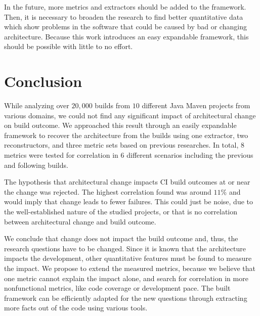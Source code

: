 \documentclass[sigplan, anonymous, review]{acmart}
\begin{document}
In the future, more metrics and extractors should be added to the framework. Then, it is necessary to broaden the research to find better quantitative data which show problems in the software that could be caused by bad or changing architecture. Because this work introduces an easy expandable framework, this should be possible with little to no effort.

\section{Conclusion}

While analyzing over $20,000$ builds from $10$ different Java Maven projects from various domains, we could not find any significant impact of architectural change on build outcome.
We approached this result through an easily expandable framework to recover the architecture from the builds using one extractor, two reconstructors, and three metric sets based on previous researches. In total, $8$ metrics were tested for correlation in $6$ different scenarios including the previous and following builds. 

The hypothesis that architectural change impacts CI build outcomes at or near the change was rejected. The highest correlation found was around $11\%$ and would imply that change leads to fewer failures. This could just be noise, due to the well-established nature of the studied projects, or that is no correlation between architectural change and build outcome. 

We conclude that change does not impact the build outcome and, thus, the research questions have to be changed. Since it is known that the architecture impacts the development, other quantitative features must be found to measure the impact. We propose to extend the measured metrics, because we believe that one metric cannot explain the impact alone, and search for correlation in more nonfunctional metrics, like code coverage or development pace.
The built framework can be efficiently adapted for the new questions through extracting more facts out of the code using various tools. 



\end{document}
